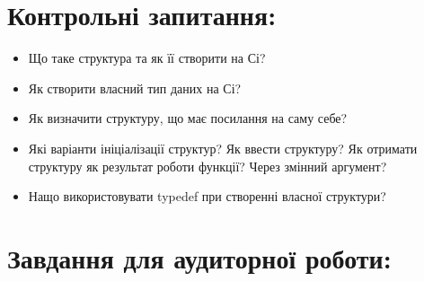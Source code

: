 \documentclass[a5paper,titlepage,openany,twoside,draft]{book_unv}%
\begin{document}
\section{Контрольні запитання:}
\begin{itemize}
\item Що таке структура та як її створити на Сі?
\item Як створити власний тип даних на Сі?
\item Як визначити структуру, що має посилання на саму себе?
\item Які варіанти ініціалізації структур? Як ввести структуру? Як отримати
структуру як результат роботи функції? Через змінний аргумент?
\item Нащо використовувати typedef при створенні власної структури?
\end{itemize}

\section{Завдання для аудиторної роботи:}
\end{document}
